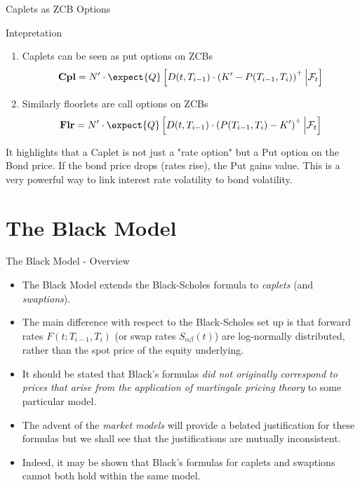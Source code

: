 \documentclass{beamer}
\begin{document}
\begin{frame}{Caplets as ZCB Options}
	\begin{block}{Intepretation}
		\begin{enumerate}
			\item Caplets can be seen as \textcolor{maincolor}{put options} on ZCBs
			\begin{equation*}
				\textbf{Cpl}=N'\cdot\expect{Q}\left[D(t,T_{i-1})\cdot\left(K'-P(T_{i-1},T_i)\right)^+ \Big\rvert \mathcal{F}_t\right]
			\end{equation*}
			\item Similarly floorlets are \textcolor{maincolor}{call options} on ZCBs
			\begin{equation}
				\textbf{Flr}=N'\cdot\expect{Q}\left[D(t, T_{i-1})\cdot\left(P(T_{i-1},T_i)-K'\right)^+ \Big\rvert \mathcal{F}_t\right]
			\end{equation}
		\end{enumerate}
	\end{block}
	It highlights that a Caplet is not just a "rate option" but a Put option on the Bond price. If the bond price drops (rates rise), the Put gains value. This is a very powerful way to link interest rate volatility to bond volatility.
\end{frame}

\section{The Black Model}
\begin{frame}{The Black Model - Overview}
	\begin{itemize}
		\item The \textcolor{maincolor}{Black Model} extends the Black-Scholes formula to \emph{caplets} (and \emph{swaptions}). 
		\item The main difference with respect to the Black-Scholes set up is that \textcolor{maincolor}{forward rates $F(t;T_{i-1},T_i)$ (or swap rates $S_{\alpha\beta}(t)$) are log-normally distributed}, rather than the spot price of the equity underlying.
		\item It should be stated that Black’s formulas \emph{did not originally correspond to prices that arise from the application of martingale pricing theory} to some particular model.
		\item The advent of the \emph{market models} will provide a belated justification for these formulas but we shall see that the justifications are mutually inconsistent.
		\item Indeed, it may be shown that Black’s formulas for caplets and swaptions cannot both hold within the same model.
	\end{itemize}
\end{frame}
\end{document}
